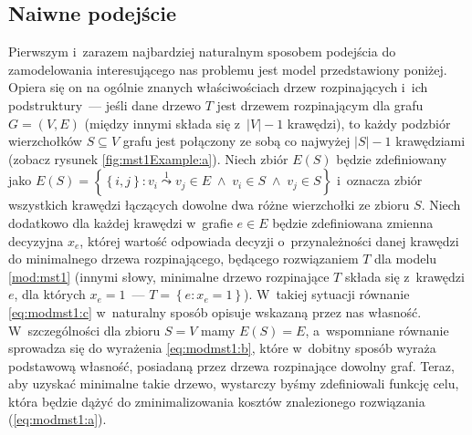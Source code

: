 \subsection{Naiwne podejście}



Pierwszym i~zarazem najbardziej naturalnym sposobem podejścia do zamodelowania interesującego nas problemu jest model przedstawiony poniżej.
Opiera się on na ogólnie znanych właściwościach drzew rozpinających i~ich podstruktury~--- jeśli dane drzewo $T$ jest drzewem rozpinającym dla grafu $G = \left( V, E \right)$ (między innymi składa się z~$\left| V \right| - 1$ krawędzi), to każdy podzbiór wierzchołków $S \subseteq V$ grafu jest połączony ze sobą co najwyżej $\left| S \right| - 1$ krawędziami (zobacz rysunek \ref{fig:mst1Example:a}).
Niech zbiór $E \left( S \right)$ będzie zdefiniowany jako $E \left( S \right) = \left\{ \left\{ i, j \right\} : v_{i} \overset{1}\leadsto v_{j} \in E \; \wedge \; v_{i} \in S \; \wedge \; v_{j} \in S \right\}$ i~oznacza zbiór wszystkich krawędzi łączących dowolne dwa różne wierzchołki ze zbioru $S$.
Niech dodatkowo dla każdej krawędzi w~grafie $e \in E$ będzie zdefiniowana zmienna decyzyjna $x_{e}$, której wartość odpowiada decyzji o~przynależności danej krawędzi do minimalnego drzewa rozpinającego, będącego rozwiązaniem $T$ dla modelu \ref{mod:mst1} (innymi słowy, minimalne drzewo rozpinające $T$ składa się z~krawędzi $e$, dla których $x_{e} = 1$~--- $T = \left\{ e : x_{e} = 1 \right\}$).
W~takiej sytuacji równanie \ref{eq:modmst1:c} w~naturalny sposób opisuje wskazaną przez nas własność.
W~szczególności dla zbioru $S = V$ mamy $E \left( S \right) = E$, a~wspomniane równanie sprowadza się do wyrażenia \ref{eq:modmst1:b}, które w~dobitny sposób wyraża podstawową własność, posiadaną przez drzewa rozpinające dowolny graf.
Teraz, aby uzyskać minimalne takie drzewo, wystarczy byśmy zdefiniowali funkcję celu, która będzie dążyć do zminimalizowania kosztów znalezionego rozwiązania (\ref{eq:modmst1:a}).

